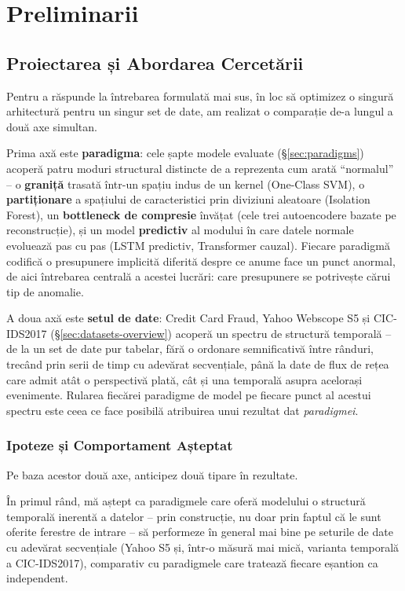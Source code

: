 \chapter{Preliminarii}
\label{ch:preliminarii}

\section{Proiectarea și Abordarea Cercetării}
\label{sec:two-axes}

Pentru a răspunde la întrebarea formulată mai sus, în loc să optimizez o singură arhitectură pentru un singur set de date, am realizat o comparație de-a lungul a două axe simultan.

Prima axă este \textbf{paradigma}: cele șapte modele evaluate (\S\ref{sec:paradigms}) acoperă patru moduri structural distincte de a reprezenta cum arată \enquote{normalul} -- o \textbf{graniță} trasată într-un spațiu indus de un kernel (One-Class SVM), o \textbf{partiționare} a spațiului de caracteristici prin diviziuni aleatoare (Isolation Forest), un \textbf{bottleneck de compresie} învățat (cele trei autoencodere bazate pe reconstrucție), și un model \textbf{predictiv} al modului în care datele normale evoluează pas cu pas (LSTM predictiv, Transformer cauzal). Fiecare paradigmă codifică o presupunere implicită diferită despre ce anume face un punct anormal, de aici întrebarea centrală a acestei lucrări: care presupunere se potrivește cărui tip de anomalie.

A doua axă este \textbf{setul de date}: Credit Card Fraud, Yahoo Webscope S5 și CIC-IDS2017 (\S\ref{sec:datasets-overview}) acoperă un spectru de structură temporală -- de la un set de date pur tabelar, fără o ordonare semnificativă între rânduri, trecând prin serii de timp cu adevărat secvențiale, până la date de flux de rețea care admit atât o perspectivă plată, cât și una temporală asupra acelorași evenimente. Rularea fiecărei paradigme de model pe fiecare punct al acestui spectru este ceea ce face posibilă atribuirea unui rezultat dat \emph{paradigmei}.

\subsection{Ipoteze și Comportament Așteptat}
\label{sec:expected-behaviour}

Pe baza acestor două axe, anticipez două tipare în rezultate.

În primul rând, mă aștept ca paradigmele care oferă modelului o structură temporală inerentă a datelor -- prin construcție, nu doar prin faptul că le sunt oferite ferestre de intrare -- să performeze în general mai bine pe seturile de date cu adevărat secvențiale (Yahoo S5 și, într-o măsură mai mică, varianta temporală a CIC-IDS2017), comparativ cu paradigmele care tratează fiecare eșantion ca independent.

